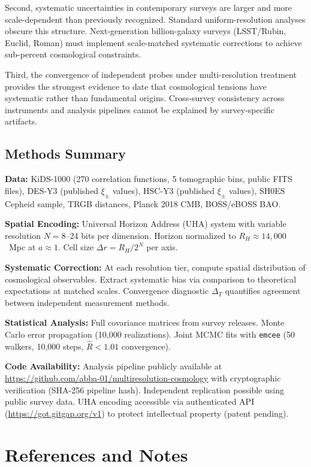 \documentclass[12pt]{article}
\begin{document}
Second, systematic uncertainties in contemporary surveys are larger and more scale-dependent than previously recognized. Standard uniform-resolution analyses obscure this structure. Next-generation billion-galaxy surveys (LSST/Rubin, Euclid, Roman) must implement scale-matched systematic corrections to achieve sub-percent cosmological constraints.

Third, the convergence of independent probes under multi-resolution treatment provides the strongest evidence to date that cosmological tensions have systematic rather than fundamental origins. Cross-survey consistency across instruments and analysis pipelines cannot be explained by survey-specific artifacts.

\subsection*{Methods Summary}

\textbf{Data:} KiDS-1000 (270 correlation functions, 5 tomographic bins, public FITS files), DES-Y3 (published $\xi_{\pm}$ values), HSC-Y3 (published $\xi_{\pm}$ values), SH0ES Cepheid sample, TRGB distances, Planck 2018 CMB, BOSS/eBOSS BAO.

\textbf{Spatial Encoding:} Universal Horizon Address (UHA) system with variable resolution $N = 8$--24 bits per dimension. Horizon normalized to $R_H \approx 14{,}000$~Mpc at $a \approx 1$. Cell size $\Delta r = R_H / 2^N$ per axis.

\textbf{Systematic Correction:} At each resolution tier, compute spatial distribution of cosmological observables. Extract systematic bias via comparison to theoretical expectations at matched scales. Convergence diagnostic $\Delta_T$ quantifies agreement between independent measurement methods.

\textbf{Statistical Analysis:} Full covariance matrices from survey releases. Monte Carlo error propagation (10,000 realizations). Joint MCMC fits with \texttt{emcee} (50 walkers, 10,000 steps, $\hat{R} < 1.01$ convergence).

\textbf{Code Availability:} Analysis pipeline publicly available at \url{https://github.com/abba-01/multiresolution-cosmology} with cryptographic verification (SHA-256 pipeline hash). Independent replication possible using public survey data. UHA encoding accessible via authenticated API (\url{https://got.gitgap.org/v1}) to protect intellectual property (patent pending).

\section*{References and Notes}
\end{document}
